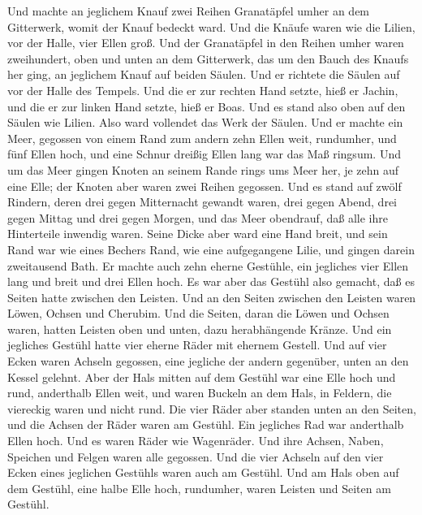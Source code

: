 Und machte an jeglichem Knauf zwei Reihen Granatäpfel umher an dem
Gitterwerk, womit der Knauf bedeckt ward.  Und die Knäufe
waren wie die Lilien, vor der Halle, vier Ellen groß.  Und
der Granatäpfel in den Reihen umher waren zweihundert, oben und unten an
dem Gitterwerk, das um den Bauch des Knaufs her ging, an jeglichem Knauf
auf beiden Säulen.  Und er richtete die Säulen auf vor der
Halle des Tempels. Und die er zur rechten Hand setzte, hieß er Jachin,
und die er zur linken Hand setzte, hieß er Boas.  Und es
stand also oben auf den Säulen wie Lilien. Also ward vollendet das Werk
der Säulen.  Und er machte ein Meer, gegossen von einem
Rand zum andern zehn Ellen weit, rundumher, und fünf Ellen hoch, und
eine Schnur dreißig Ellen lang war das Maß ringsum.  Und um
das Meer gingen Knoten an seinem Rande rings ums Meer her, je zehn auf
eine Elle; der Knoten aber waren zwei Reihen gegossen.  Und
es stand auf zwölf Rindern, deren drei gegen Mitternacht gewandt waren,
drei gegen Abend, drei gegen Mittag und drei gegen Morgen, und das Meer
obendrauf, daß alle ihre Hinterteile inwendig waren.  Seine
Dicke aber ward eine Hand breit, und sein Rand war wie eines Bechers
Rand, wie eine aufgegangene Lilie, und gingen darein zweitausend Bath.
 Er machte auch zehn eherne Gestühle, ein jegliches vier
Ellen lang und breit und drei Ellen hoch.  Es war aber das
Gestühl also gemacht, daß es Seiten hatte zwischen den Leisten.
 Und an den Seiten zwischen den Leisten waren Löwen, Ochsen
und Cherubim. Und die Seiten, daran die Löwen und Ochsen waren, hatten
Leisten oben und unten, dazu herabhängende Kränze.  Und ein
jegliches Gestühl hatte vier eherne Räder mit ehernem Gestell. Und auf
vier Ecken waren Achseln gegossen, eine jegliche der andern gegenüber,
unten an den Kessel gelehnt.  Aber der Hals mitten auf dem
Gestühl war eine Elle hoch und rund, anderthalb Ellen weit, und waren
Buckeln an dem Hals, in Feldern, die viereckig waren und nicht rund.
 Die vier Räder aber standen unten an den Seiten, und die
Achsen der Räder waren am Gestühl. Ein jegliches Rad war anderthalb
Ellen hoch.  Und es waren Räder wie Wagenräder. Und ihre
Achsen, Naben, Speichen und Felgen waren alle gegossen. 
Und die vier Achseln auf den vier Ecken eines jeglichen Gestühls waren
auch am Gestühl.  Und am Hals oben auf dem Gestühl, eine
halbe Elle hoch, rundumher, waren Leisten und Seiten am Gestühl.

